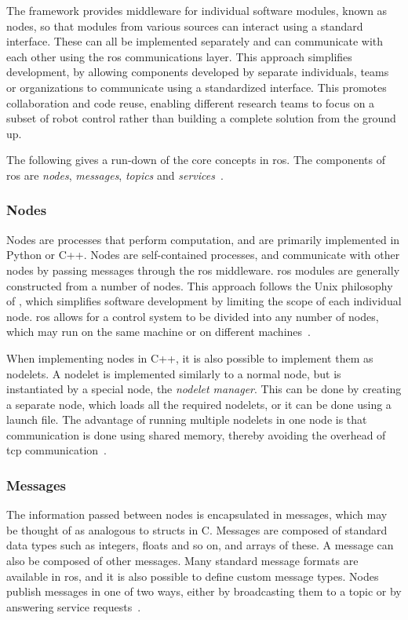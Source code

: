 \documentclass[\rootfolder/main.tex]{subfiles}
\begin{document}
The framework provides middleware for individual software modules, known as nodes, so that modules from various sources can interact using a standard interface.
These can all be implemented separately and can communicate with each other using the \acrshort{ros} communications layer.
This approach simplifies development, by allowing components developed by separate individuals, teams or organizations to communicate using a standardized interface.
This promotes collaboration and code reuse, enabling different research teams to focus on a subset of robot control rather than building a complete solution from the ground up.

The following gives a run-down of the core concepts in \acrshort{ros}.
The components of \acrshort{ros} are \emph{nodes}, \emph{messages}, \emph{topics} and \emph{services}~\cite{Quigley2009}.

\subsubsection{Nodes}

Nodes are processes that perform computation, and are primarily implemented in Python or C++.
Nodes are self-contained processes, and communicate with other nodes by passing messages through the \acrshort{ros} middleware.
\acrshort{ros} modules are generally constructed from a number of nodes.
This approach follows the Unix philosophy of , which simplifies software development by limiting the scope of each individual node.
\acrshort{ros} allows for a control system to be divided into any number of nodes, which may run on the same machine or on different machines~\cite{ROS}.

When implementing nodes in C++, it is also possible to implement them as nodelets.
A nodelet is implemented similarly to a normal node, but is instantiated by a special node, the \emph{nodelet manager}.
This can be done by creating a separate node, which loads all the required nodelets, or it can be done using a launch file.
The advantage of running multiple nodelets in one node is that communication is done using shared memory, thereby avoiding the overhead of \acrshort{tcp} communication~\cite{Quigley2009}.

\subsubsection{Messages}

The information passed between nodes is encapsulated in messages, which may be thought of as analogous to structs in C.
Messages are composed of standard data types such as integers, floats and so on, and arrays of these.
A message can also be composed of other messages.
Many standard message formats are available in \acrshort{ros}, and it is also possible to define custom message types.
Nodes publish messages in one of two ways, either by broadcasting them to a topic or by answering service requests~\cite{Quigley2009}.
\end{document}
